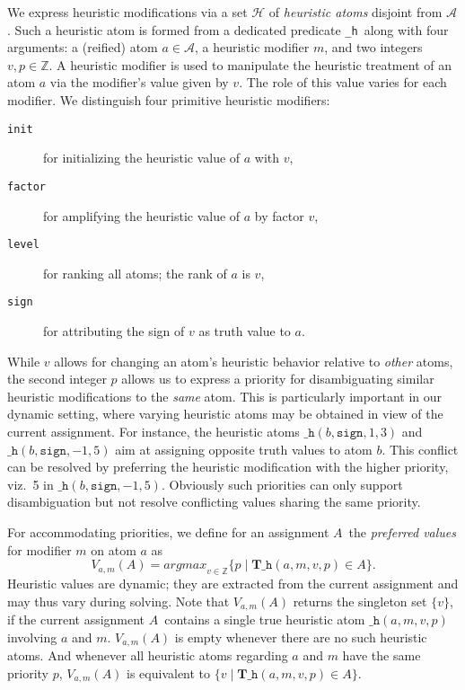 \documentclass[letterpaper]{article}
\newcommand{\hpredicate}{\texttt{\_h}}
\newcommand{\hpred}[4]{\ensuremath{\hpredicate(#1,{#2},#3,#4)}}
\newcommand{\true}{\ensuremath{\boldsymbol{T}}}
\newcommand{\Tsigned}[1]{\ensuremath{\true{#1}}}\message{ *** RENAME *** }
\newcommand{\ass}{\ensuremath{A}}
\begin{document}
We express heuristic modifications via a set $\mathcal{H}$ of \emph{heuristic atoms} 
disjoint from $\mathcal{A}$.
Such a heuristic atom is formed from a dedicated predicate \hpredicate\ along with four arguments:
a (reified) atom $a\in\mathcal{A}$,
a heuristic modifier $m$,
and two  integers $v,p\in\mathbb{Z}$.
A heuristic modifier is used to manipulate the heuristic treatment of an atom $a$ via the 
modifier's value given by $v$.
The role of this value varies for each modifier.
We distinguish four primitive heuristic modifiers:
\begin{description}
\item [\texttt{init}] for initializing the heuristic value of $a$ with $v$,
\item [\texttt{factor}] for amplifying the heuristic value of $a$ by factor $v$,
\item [\texttt{level}] for ranking all atoms; the rank of $a$ is $v$,
\item [\texttt{sign}] for attributing the sign of $v$ as truth value to $a$.
\end{description}
While $v$ allows for changing an atom's heuristic behavior relative to \emph{other} atoms,
the second integer $p$ allows us to express a priority for disambiguating similar
heuristic modifications to the \emph{same} atom.
This is particularly important in our dynamic setting, where varying heuristic atoms may be obtained
in view of the current assignment.
For instance, the heuristic atoms
\hpred{b}{\mathtt{sign}}{1}{3}
and
\hpred{b}{\mathtt{sign}}{-1}{5}
aim at assigning opposite truth values to atom $b$.
This conflict can be resolved by preferring the heuristic modification with the higher priority,
viz.\ 5 in \hpred{b}{\mathtt{sign}}{-1}{5}.
Obviously such priorities can only support disambiguation but not resolve conflicting values sharing the same priority.

For accommodating priorities,
we define for an assignment \ass\ the \emph{preferred values} for modifier $m$ on atom $a$ as
\[
V_{a,m}(\ass)=
\textit{argmax}_{v\in\mathbb{Z}}\{p\mid\Tsigned{\hpred{a}{m}{v}{p}}\in\ass\}.
\]
Heuristic values are dynamic;
they are extracted from the current assignment and may thus vary during solving.
Note that $V_{a,m}(\ass)$ returns the singleton set $\{v\}$,
if the current assignment \ass\ contains a single true heuristic atom \hpred{a}{m}{v}{p} 
involving $a$ and $m$.
$V_{a,m}(\ass)$ is empty whenever there are no such heuristic atoms.
%
And whenever all heuristic atoms regarding $a$ and $m$ have the same priority $p$,
$V_{a,m}(\ass)$ is equivalent to
\(
\{v\mid\Tsigned{\hpred{a}{m}{v}{p}}\in\ass\}
\).
\end{document}
